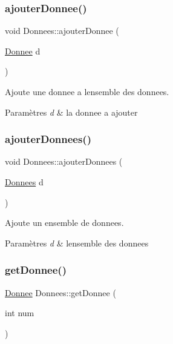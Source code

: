 \subsubsection{\texorpdfstring{ajouter\+Donnee()}{ajouterDonnee()}}
{\footnotesize\ttfamily void Donnees\+::ajouter\+Donnee (\begin{DoxyParamCaption}\item[{\hyperlink{classDonnee}{Donnee}}]{d }\end{DoxyParamCaption})}



Ajoute une donnee a l\textquotesingle{}ensemble des donnees. 


\begin{DoxyParams}{Paramètres}
{\em d} & la donnee a ajouter \\
\hline
\end{DoxyParams}
\mbox{\label{classDonnees_a26d282aff1a7adfdcaea1a3cab6ffbaf}} 
\subsubsection{\texorpdfstring{ajouter\+Donnees()}{ajouterDonnees()}}
{\footnotesize\ttfamily void Donnees\+::ajouter\+Donnees (\begin{DoxyParamCaption}\item[{\hyperlink{classDonnees}{Donnees}}]{d }\end{DoxyParamCaption})}



Ajoute un ensemble de donnees. 


\begin{DoxyParams}{Paramètres}
{\em d} & l\textquotesingle{}ensemble des donnees \\
\hline
\end{DoxyParams}
\mbox{\label{classDonnees_a1986c4b95b3cf90767dbe966b2497ae8}} 
\subsubsection{\texorpdfstring{get\+Donnee()}{getDonnee()}}
{\footnotesize\ttfamily \hyperlink{classDonnee}{Donnee} Donnees\+::get\+Donnee (\begin{DoxyParamCaption}\item[{int}]{num }\end{DoxyParamCaption})}



